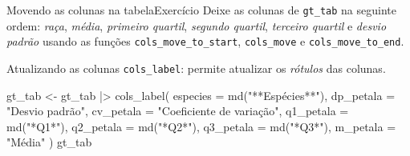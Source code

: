 \documentclass[
  10pt,
  ignorenonframetext,
]{beamer}
\newenvironment{Shaded}{\begin{snugshade}}{\end{snugshade}}
\newcommand{\AttributeTok}[1]{\textcolor[rgb]{0.40,0.45,0.13}{#1}}
\newcommand{\FunctionTok}[1]{\textcolor[rgb]{0.28,0.35,0.67}{#1}}
\newcommand{\NormalTok}[1]{\textcolor[rgb]{0.00,0.23,0.31}{#1}}
\newcommand{\OtherTok}[1]{\textcolor[rgb]{0.00,0.23,0.31}{#1}}
\newcommand{\SpecialCharTok}[1]{\textcolor[rgb]{0.37,0.37,0.37}{#1}}
\newcommand{\StringTok}[1]{\textcolor[rgb]{0.13,0.47,0.30}{#1}}
\begin{document}
\begin{frame}[fragile]{Movendo as colunas na tabela\newline Exercício}
\protect\hypertarget{movendo-as-colunas-na-tabelaexercuxedcio}{}
Deixe as colunas de \texttt{gt\_tab} na seguinte ordem: \emph{raça},
\emph{média}, \emph{primeiro quartil}, \emph{segundo quartil},
\emph{terceiro quartil} e \emph{desvio padrão} usando as funções
\texttt{cols\_move\_to\_start}, \texttt{cols\_move} e
\texttt{cols\_move\_to\_end}.
\end{frame}

\begin{frame}[fragile]{Atualizando as colunas}
\protect\hypertarget{atualizando-as-colunas}{}
\texttt{cols\_label}: permite atualizar os \emph{rótulos} das colunas.

\begin{Shaded}
\begin{Highlighting}[]
\NormalTok{gt\_tab }\OtherTok{\textless{}{-}}\NormalTok{ gt\_tab }\SpecialCharTok{|\textgreater{}}
  \FunctionTok{cols\_label}\NormalTok{(}
    \AttributeTok{especies =} \FunctionTok{md}\NormalTok{(}\StringTok{"**Espécies**"}\NormalTok{),}
    \AttributeTok{dp\_petala =} \StringTok{"Desvio padrão"}\NormalTok{,}
    \AttributeTok{cv\_petala =} \StringTok{"Coeficiente de variação"}\NormalTok{,}
    \AttributeTok{q1\_petala =} \FunctionTok{md}\NormalTok{(}\StringTok{"*Q1*"}\NormalTok{),}
    \AttributeTok{q2\_petala =} \FunctionTok{md}\NormalTok{(}\StringTok{"*Q2*"}\NormalTok{),}
    \AttributeTok{q3\_petala =} \FunctionTok{md}\NormalTok{(}\StringTok{"*Q3*"}\NormalTok{),}
    \AttributeTok{m\_petala =} \StringTok{"Média"}
\NormalTok{  )}
\NormalTok{gt\_tab}
\end{Highlighting}
\end{Shaded}
\end{frame}
\end{document}
